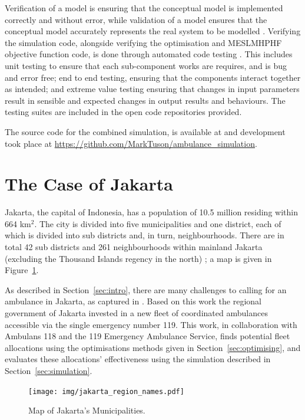 \documentclass[numbers,webpdf,imaman]{ima-authoring-template}%
\begin{document}
Verification of a model is ensuring that the conceptual model is implemented
correctly and without error, while validation of a model ensures that the
conceptual model accurately represents the real system to be modelled
\citep{robinson2014simulation}. Verifying the simulation code, alongside
verifying the optimisation and MESLMHPHF objective function code, is done
through automated code testing \citep{percival2014test, palmer2023implementing}.
This includes unit testing to ensure that each sub-component works are requires,
and is bug and error free; end to end testing, ensuring that the components
interact together as intended; and extreme value testing ensuring that changes
in input parameters result in sensible and expected changes in output results
and behaviours. The testing suites are included in the open code repositories
provided.

The source code for the combined simulation, is available at \citet{zenodo_sim}
and development took place at \url{https://github.com/MarkTuson/ambulance_simulation}.





\section{The Case of Jakarta}\label{sec:jakarta}
Jakarta, the capital of Indonesia, has a population of 10.5 million
\citep{BPS_Jakarta} residing within 664 km$^2$. The city is divided into five
municipalities and one district, each of which is divided into sub districts
and, in turn, neighbourhoods. There are in total 42 sub districts and 261
neighbourhoods within mainland Jakarta (excluding the Thousand Islands regency
in the north) \citep{BPS_Jakarta_angka}; a map is given in
Figure~\ref{fig:region_names}. 

As described in Section~\ref{sec:intro}, there are many challenges to calling
for an ambulance in Jakarta, as captured in \citet{BriceSyaribahNoor2022Esui}.
Based on this work the regional government of Jakarta invested in a new fleet
of coordinated ambulances accessible via the single emergency number 119.
This work, in collaboration with Ambulans 118 and the 119 Emergency Ambulance
Service, finds potential fleet allocations using the optimisations methods
given in Section~\ref{sec:optimising}, and evaluates these allocations'
effectiveness using the simulation described in Section~\ref{sec:simulation}.

\begin{figure}
\begin{center}
\texttt{[image: img/jakarta\_region\_names.pdf]}
\end{center}
\caption{Map of Jakarta's Municipalities.}
\label{fig:region_names}
\end{figure}
\end{document}

